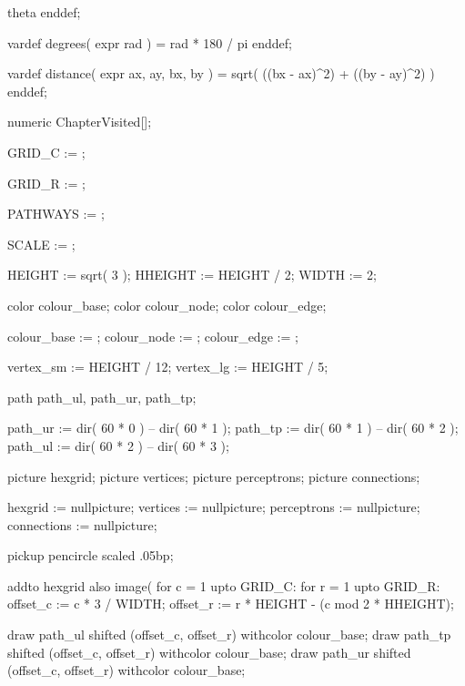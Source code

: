     theta
  enddef;

  vardef degrees( expr rad ) =
    rad * 180 / pi
  enddef;

  vardef distance( expr ax, ay, bx, by ) =
    sqrt( ((bx - ax)^2) + ((by - ay)^2) )
  enddef;

  numeric ChapterVisited[];
\stopMPinclusions

  GRID_C := ;

  GRID_R := ;

  PATHWAYS := ;

  SCALE := ;

  HEIGHT  := sqrt( 3 );
  HHEIGHT := HEIGHT / 2;
  WIDTH   := 2;

  color colour_base;
  color colour_node;
  color colour_edge;

  colour_base := ;
  colour_node := ;
  colour_edge := ;

  vertex_sm := HEIGHT / 12;
  vertex_lg := HEIGHT / 5;

  path path_ul, path_ur, path_tp;

  path_ur := dir( 60 * 0 ) -- dir( 60 * 1 );
  path_tp := dir( 60 * 1 ) -- dir( 60 * 2 );
  path_ul := dir( 60 * 2 ) -- dir( 60 * 3 );

  picture hexgrid;
  picture vertices;
  picture perceptrons;
  picture connections;

  hexgrid := nullpicture;
  vertices := nullpicture;
  perceptrons := nullpicture;
  connections := nullpicture;

  pickup pencircle scaled .05bp;

  addto hexgrid also image(
    for c = 1 upto GRID_C:
      for r = 1 upto GRID_R:
        offset_c := c * 3 / WIDTH;
        offset_r := r * HEIGHT - (c mod 2 * HHEIGHT);

        draw path_ul shifted (offset_c, offset_r) withcolor colour_base;
        draw path_tp shifted (offset_c, offset_r) withcolor colour_base;
        draw path_ur shifted (offset_c, offset_r) withcolor colour_base;

